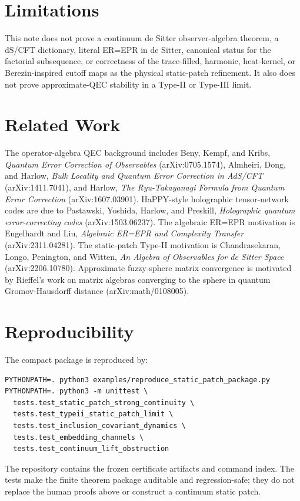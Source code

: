 \documentclass[11pt]{article}
\begin{document}
\section{Limitations}

This note does not prove a continuum de Sitter observer-algebra theorem, a
dS/CFT dictionary, literal ER=EPR in de Sitter, canonical status for the
factorial subsequence, or correctness of the trace-filled, harmonic,
heat-kernel, or Berezin-inspired cutoff maps as the physical static-patch
refinement. It also does not prove approximate-QEC stability in a Type-II or
Type-III limit.

\section{Related Work}

The operator-algebra QEC background includes Beny, Kempf, and Kribs,
\emph{Quantum Error Correction of Observables} (arXiv:0705.1574), Almheiri,
Dong, and Harlow, \emph{Bulk Locality and Quantum Error Correction in
AdS/CFT} (arXiv:1411.7041), and Harlow, \emph{The Ryu-Takayanagi Formula from
Quantum Error Correction} (arXiv:1607.03901). HaPPY-style holographic
tensor-network codes are due to Pastawski, Yoshida, Harlow, and Preskill,
\emph{Holographic quantum error-correcting codes} (arXiv:1503.06237). The
algebraic ER=EPR motivation is Engelhardt and Liu, \emph{Algebraic ER=EPR and
Complexity Transfer} (arXiv:2311.04281). The static-patch Type-II motivation
is Chandrasekaran, Longo, Penington, and Witten, \emph{An Algebra of
Observables for de Sitter Space} (arXiv:2206.10780). Approximate fuzzy-sphere
matrix convergence is motivated by Rieffel's work on matrix algebras
converging to the sphere in quantum Gromov-Hausdorff distance
(arXiv:math/0108005).

\section{Reproducibility}

The compact package is reproduced by:
\begin{verbatim}
PYTHONPATH=. python3 examples/reproduce_static_patch_package.py
PYTHONPATH=. python3 -m unittest \
  tests.test_static_patch_strong_continuity \
  tests.test_typeii_static_patch_limit \
  tests.test_inclusion_covariant_dynamics \
  tests.test_embedding_channels \
  tests.test_continuum_lift_obstruction
\end{verbatim}
The repository contains the frozen certificate artifacts and command index.
The tests make the finite theorem package auditable and regression-safe; they
do not replace the human proofs above or construct a continuum static patch.
\end{document}
